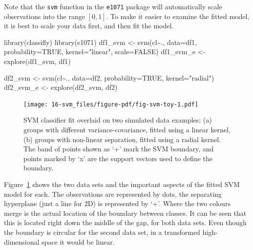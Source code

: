 \documentclass[
  letterpaper,
]{krantz}
\newenvironment{Shaded}{\begin{snugshade}}{\end{snugshade}}
\newcommand{\AttributeTok}[1]{\textcolor[rgb]{0.40,0.45,0.13}{#1}}
\newcommand{\ConstantTok}[1]{\textcolor[rgb]{0.56,0.35,0.01}{#1}}
\newcommand{\FunctionTok}[1]{\textcolor[rgb]{0.28,0.35,0.67}{#1}}
\newcommand{\NormalTok}[1]{\textcolor[rgb]{0.00,0.23,0.31}{#1}}
\newcommand{\OtherTok}[1]{\textcolor[rgb]{0.00,0.23,0.31}{#1}}
\newcommand{\SpecialCharTok}[1]{\textcolor[rgb]{0.37,0.37,0.37}{#1}}
\newcommand{\StringTok}[1]{\textcolor[rgb]{0.13,0.47,0.30}{#1}}
\begin{document}
Note that the \texttt{svm} function in the \texttt{e1071} package will
automatically scale observations into the range \([0,1]\). To make it
easier to examine the fitted model, it is best to scale your data first,
and then fit the model.

\begin{Shaded}
\begin{Highlighting}[]
\FunctionTok{library}\NormalTok{(classifly)}
\FunctionTok{library}\NormalTok{(e1071)}
\NormalTok{df1\_svm }\OtherTok{\textless{}{-}} \FunctionTok{svm}\NormalTok{(cl}\SpecialCharTok{\textasciitilde{}}\NormalTok{., }\AttributeTok{data=}\NormalTok{df1, }
                     \AttributeTok{probability=}\ConstantTok{TRUE}\NormalTok{, }
                     \AttributeTok{kernel=}\StringTok{"linear"}\NormalTok{, }
               \AttributeTok{scale=}\ConstantTok{FALSE}\NormalTok{)}
\NormalTok{df1\_svm\_e }\OtherTok{\textless{}{-}} \FunctionTok{explore}\NormalTok{(df1\_svm, df1)}

\NormalTok{df2\_svm }\OtherTok{\textless{}{-}} \FunctionTok{svm}\NormalTok{(cl}\SpecialCharTok{\textasciitilde{}}\NormalTok{., }\AttributeTok{data=}\NormalTok{df2,  }
                     \AttributeTok{probability=}\ConstantTok{TRUE}\NormalTok{, }
                     \AttributeTok{kernel=}\StringTok{"radial"}\NormalTok{)}
\NormalTok{df2\_svm\_e }\OtherTok{\textless{}{-}} \FunctionTok{explore}\NormalTok{(df2\_svm, df2)}
\end{Highlighting}
\end{Shaded}

\begin{figure}

{\centering \texttt{[image: 16-svm\_files/figure-pdf/fig-svm-toy-1.pdf]}

}

\caption{\label{fig-svm-toy}SVM classifier fit overlaid on two simulated
data examples: (a) groups with different variance-covariance, fitted
using a linear kernel, (b) groups with non-linear separation, fitted
using a radial kernel. The band of points shown as `+' mark the SVM
boundary, and points marked by `x' are the support vectors used to
define the boundary.}

\end{figure}

Figure~\ref{fig-svm-toy} shows the two data sets and the important
aspects of the fitted SVM model for each. The observations are
represented by dots, the separating hyperplane (just a line for 2D) is
represented by `+'. Where the two colours merge is the actual location
of the boundary between classes. It can be seen that this is located
right down the middle of the gap, for both data sets. Even though the
boundary is circular for the second data set, in a transformed
high-dimensional space it would be linear.
\end{document}
